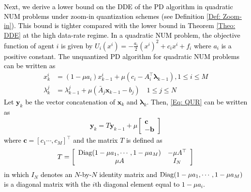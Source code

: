 \documentclass[10pt,twocolumn,twoside]{IEEEtran}
\begin{document}
\textcolor{black}{Next, we derive a lower bound on the DDE of the PD algorithm in quadratic NUM problems under zoom-in quantization schemes (see Definition \ref{Def: Zoom-in}). This bound is tighter compared with the lower bound in Theorem \ref{Theo: DDE} at the high data-rate regime. In a quadratic NUM problem, the objective function of agent $i$ is given by $U_i{\left({x^i}\right)}=-\frac{a_i}{2}{\left({x^i}\right)}^2+c_ix^i+f_i$ where $a_i$ is a positive constant. The unquantized PD algorithm for quadratic NUM problems can be written as  
\begin{align}\label{Eq: QUR}
x^{i}_{k}&={\left({1-\mu a_i}\right)}x^{i}_{k-1}+\mu {\left({c_i-A^\top_i{\ensuremath{\boldsymbol{{\lambda}}}}_{k-1}}\right)},\nonumber  1\leq i\leq M\\
\lambda^{j}_{k}&=\lambda^j_{k-1}+\mu{\left({\bar{A}_j{\ensuremath{\boldsymbol{{x}}}}_{k-1}-b_j}\right)}\quad 1\leq j\leq N
\end{align}
 Let ${\ensuremath{\boldsymbol{{y}}}}_k$ be the vector concatenation of ${\ensuremath{\boldsymbol{{x}}}}_k$ and ${\ensuremath{\boldsymbol{{\lambda}}}}_k$. Then, \eqref{Eq: QUR} can be written as 
\begin{align}
{\ensuremath{\boldsymbol{{y}}}}_{k}=T{\ensuremath{\boldsymbol{{y}}}}_{k-1}+\mu
\left[
\begin{array}{c}
{\ensuremath{\boldsymbol{{c}}}}\\
-{\ensuremath{\boldsymbol{{b}}}}
\end{array}
\right]\nonumber
\end{align}
 where ${\ensuremath{\boldsymbol{{c}}}}=\left[c_1\cdots,c_M\right]^\top$ and the matrix $T$ is defined as  
\begin{align}
T=\left[
 \begin{array}{cc}
	{\rm Diag}{\left({1-\mu a_1,\cdots,1-\mu a_M}\right)}&-\mu A^\top\\
	\mu A&I_{N}
\end{array}
\right]
\end{align}
in which $I_N$ denotes an $N$-by-$N$ identity matrix and ${\rm Diag}{\left({1-\mu a_1,\cdots,1-\mu a_M}\right)}$ is a diagonal matrix with the $i$th diagonal element equal to $1-\mu a_i$.} 
\end{document}
